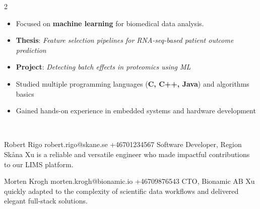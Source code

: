 \documentclass[10pt,a4paper,ragged2e,withhyper]{altacv}
\newcommand{\strong}[1]{\textcolor{Gunmetal}{\textbf{#1}}}
\begin{document}
\begin{paracol}{2}
\medskip
{}
\medskip
{}

\switchcolumn


\begin{itemize}
    \item Focused on \strong{machine learning} for biomedical data analysis.
    \item \strong{Thesis}: \textit{Feature selection pipelines for RNA-seq-based patient outcome prediction} \href{https://github.com/ChiXX/isoform}{\faLink}
    \item \strong{Project}: \textit{Detecting batch effects in proteomics using ML} \href{https://github.com/ChiXX/BatchEffect}{\faLink}
\end{itemize}

\divider

\begin{itemize}
    \item Studied multiple programming languages (\strong{C, C++, Java}) and algorithms basics
    \item Gained hands-on experience in embedded systems and hardware development
\end{itemize}


     

\vspace{1em}

      \\

  {Robert Rigo}
  {robert.rigo@skane.se}
  {+46701234567}
  {Software Developer, Region Skåna}
  {Xu is a reliable and versatile engineer who made impactful contributions to our LIMS platform.}

\vspace{1em}

  {Morten Krogh}
  {morten.krogh@bionamic.io}
  {+46709876543}
  {CTO, Bionamic AB}
  {Xu quickly adapted to the complexity of scientific data workflows and delivered elegant full-stack solutions.}

\end{paracol}
\end{document}
